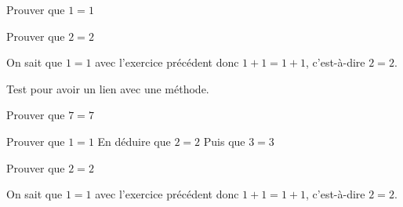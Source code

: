 \documentclass[nocrop]{sesamanuel}
\begin{document}
\exercicesbase
\begin{colonne*exercice}
  \begin{exercice}
  Prouver que $1=1$
  \end{exercice}
  \begin{exercice*}
  Prouver que $2=2$
  \end{exercice*}
  \begin{corrige}
  On sait que $1=1$ avec l’exercice précédent donc $1+1=1+1$,
  c’est-à-dire $2=2$.
  \end{corrige}
  \begin{exercice}
  \label{exo-exemple3}
  Test pour avoir un lien avec une méthode.
  \end{exercice}
  \begin{exercice}
    Prouver que $7=7$
  \end{exercice}

  \begin{exercice}
    \partie
    Prouver que $1=1$
    \partie
    En déduire que $2=2$
    \partie 
    Puis que $3=3$
  \end{exercice}
  \begin{exercice*}
  Prouver que $2=2$
  \end{exercice*}
  \begin{corrige}
  On sait que $1=1$ avec l’exercice précédent donc $1+1=1+1$,
  c’est-à-dire $2=2$.
  \end{corrige}
\end{colonne*exercice}
\end{document}
